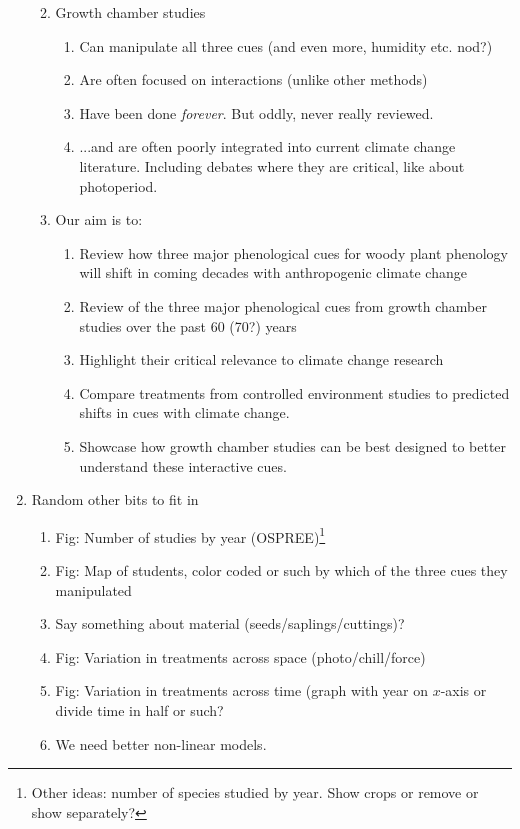 \documentclass[11pt,letterpaper]{article}
\begin{document}
\begin{enumerate}
\begin{enumerate}
\begin{enumerate}
\end{enumerate}
\item Growth chamber studies
\begin{enumerate}
\item Can manipulate all three cues (and even more, humidity etc. nod?)
\item Are often focused on interactions (unlike other methods)
\item Have been done \emph{forever}. But oddly, never really reviewed.
\item  ...and are often poorly integrated into current climate change literature. Including debates where they are critical, like about photoperiod.
\end{enumerate}
\item Our aim is to:
\begin{enumerate}
\item Review how three major phenological cues for woody plant phenology will shift in coming decades with anthropogenic climate change
\item Review of the three major phenological cues from growth chamber studies over the past 60 (70?) years
\item Highlight their critical relevance to climate change research
\item Compare treatments from controlled environment studies to predicted shifts in cues with climate change.  
\item Showcase how growth chamber studies can be best designed to better understand these interactive cues. 
\end{enumerate}
\end{enumerate}
\item Random other bits to fit in
\begin{enumerate}
\item Fig: Number of studies by year (OSPREE)\footnote{Other ideas: number of species studied by year. Show crops or remove or show separately?}
\item Fig: Map of students, color coded or such by which of the three cues they manipulated
\item Say something about material (seeds/saplings/cuttings)?
\item Fig: Variation in treatments across space (photo/chill/force)
\item Fig: Variation in treatments across time (graph with year on $x$-axis or divide time in half or such? 
\item We need better non-linear models.

\end{enumerate}
\end{enumerate}
\end{document}
